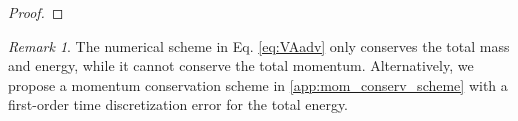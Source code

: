 \documentclass[preprint,1p,times]{elsarticle}
\theoremstyle{definition}
\theoremstyle{remark}
\newtheorem{remark}[theorem]{Remark}
\begin{document}
\begin{proof}
\end{proof}

\begin{remark}
    The numerical scheme in Eq. \eqref{eq:VAadv} only conserves the total mass and energy, while it cannot conserve the total momentum. Alternatively, we propose a momentum conservation scheme in \ref{app:mom_conserv_scheme} with a first-order time discretization error for the total energy.
\end{remark}

\end{document}
